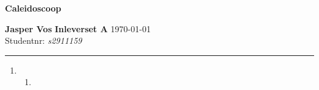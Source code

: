 \documentclass{article}
\begin{document}
{\Large \textbf{Caleidoscoop}}

\bigskip

\textbf{Jasper Vos} \hfill \textbf{Inleverset A} \hfill \today \\
Studentnr: \emph{s2911159}

\rule{\textwidth}{2pt}

\bigskip

\begin{enumerate}[label=\arabic*]
    \item
          \begin{enumerate}[label=\alph*)]
              \item
          \end{enumerate}
\end{enumerate}
\end{document}
